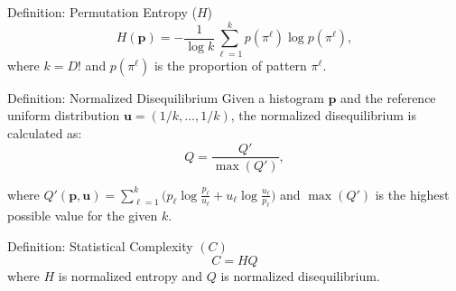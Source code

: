 \documentclass[11pt]{beamer}
\begin{document}
\begin{frame}
	
	\begin{block}{Definition: Permutation Entropy ($H$)}
		\[
		H(\mathbf{p}) = -\dfrac{1}{\log k} \sum_{\ell=1}^{k} p(\pi^\ell) \log p(\pi^\ell),
		\]
		where $k=D!$ and $p(\pi^\ell)$ is the proportion of pattern $\pi^\ell$.
	\end{block}
	
	\begin{block}{Definition: Normalized Disequilibrium}
		Given a histogram $\mathbf{p}$ and the reference uniform distribution $\mathbf{u} = (1/k, \ldots, 1/k)$, the normalized disequilibrium is calculated as:
			\[
		Q = \frac{Q'}{\max(Q')},
	\]
	
where $	Q'(\mathbf{p},\mathbf{u}) = \sum_{\ell=1}^k \Big( p_\ell \log\frac{p_\ell}{u_\ell} + u_\ell \log\frac{u_\ell}{p_\ell} \Big)$ and $\max(Q')$ is the highest possible value for the given $k$.

	\end{block}		

\begin{block}{Definition: Statistical Complexity $(C)$ }
	\[
	C = H Q
	\]
	where $H$ is normalized entropy and $Q$ is normalized disequilibrium.
\end{block}
	
\end{frame}



\end{document}
